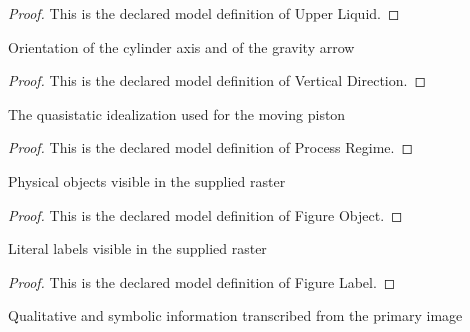 \begin{proof}
  This is the declared model definition of Upper Liquid.
\end{proof}
\begin{definition}
  \label{def:physics:phyx-mini-0457:phyxminiproblems-problemphyxmini0457-verticaldirection}
  Orientation of the cylinder axis and of the gravity arrow
\end{definition}
\begin{proof}
  This is the declared model definition of Vertical Direction.
\end{proof}
\begin{definition}
  \label{def:physics:phyx-mini-0457:phyxminiproblems-problemphyxmini0457-processregime}
  The quasistatic idealization used for the moving piston
\end{definition}
\begin{proof}
  This is the declared model definition of Process Regime.
\end{proof}
\begin{definition}
  \label{def:physics:phyx-mini-0457:phyxminiproblems-problemphyxmini0457-figureobject}
  Physical objects visible in the supplied raster
\end{definition}
\begin{proof}
  This is the declared model definition of Figure Object.
\end{proof}
\begin{definition}
  \label{def:physics:phyx-mini-0457:phyxminiproblems-problemphyxmini0457-figurelabel}
  Literal labels visible in the supplied raster
\end{definition}
\begin{proof}
  This is the declared model definition of Figure Label.
\end{proof}
\begin{definition}
  \label{def:physics:phyx-mini-0457:phyxminiproblems-problemphyxmini0457-waterpistoncylinderfigure}
  Qualitative and symbolic information transcribed from the primary image
\end{definition}
